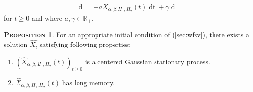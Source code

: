 \documentclass[a4paper, twoside, 11pt]{article}
\theoremstyle{definition}
\newtheorem{proposition}[definition]{\scshape Proposition}
\begin{document}
\begin{eqnarray}
  \mathop{dX_{\alpha,\beta,H_1,H_2}(t)} = -aX_{\alpha,\beta,H_1,H_2}(t)\mathop{dt} + \gamma \mathop{dM_{\alpha,\beta,H_1,H_2}(t)}
  \label{sec:wfsv}
\end{eqnarray}
for $t\ge 0$ and where $a, \gamma \in \mathbb{R}_+$.

\begin{proposition}
  For an appropriate initial condition of (\ref{sec:wfsv}), there exists a solution $\hat{X_t}$ satisfying following properties:
\begin{enumerate}[topsep=0pt, itemsep=-1ex, partopsep=1ex, parsep=1ex, label=(\roman*)]
  \item $(\hat{X}_{\alpha,\beta,H_1,H_2}(t))_{t\ge 0}$ is a centered Gaussian stationary process.
  \item $ \hat{X}_{\alpha,\beta,H_1,H_2}(t)$ has long memory.
  \end{enumerate}
\end{proposition}
\end{document}
